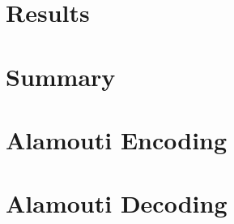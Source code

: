 \documentclass[12pt,onecolumn]{IEEEtran}
\begin{document}
\section{Results}


\section{Summary}




\appendix
\section{Alamouti Encoding}
\section{Alamouti Decoding}
\end{document}
